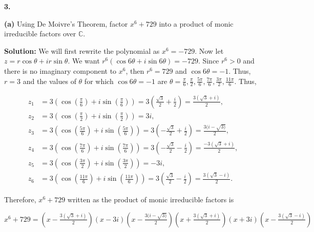 \documentclass[12pt, a4paper]{article}
\begin{document}
\vspace{6mm}

\noindent\textbf{3.}\par

\vspace{2mm}

\textbf{(a)} Using De Moivre's Theorem, factor $x^6+729$ into a product of monic irreducible factors over $\mathbb{C}$.

\vspace{4mm}

\noindent\textbf{Solution: }We will first rewrite the polynomial as $x^6=-729$. Now let $z=r\cos{\theta}+ir\sin{\theta}$. We want $r^6(\cos{6\theta}+i\sin{6\theta})=-729$. Since $r^6>0$ and there is no imaginary component to $x^6$, then $r^6=729$ and $\cos{6\theta}=-1$. Thus, $r=3$ and the values of $\theta$ for which $\cos{6\theta}=-1$ are $\theta=\frac{\pi}{6},\frac{\pi}{2},\frac{5\pi}{6},\frac{7\pi}{6},\frac{3\pi}{2},\frac{11\pi}{6}$. Thus,\par

\begin{align*} 
z_1 &=  3(\cos{(\frac{\pi}{6})}+i\sin{(\frac{\pi}{6})}) = 3(\frac{\sqrt{3}}{2}+\frac{i}{2})=\frac{3(\sqrt{3}+i)}{2}, \\ 
z_2 &=  3(\cos{(\frac{\pi}{2})}+i\sin{(\frac{\pi}{2})})=3i, \\
z_3 &=  3(\cos{(\frac{5\pi}{6})}+i\sin{(\frac{5\pi}{6})})=3(-\frac{\sqrt{3}}{2}+\frac{i}{2})=\frac{3(i-\sqrt{3)}}{2}, \\
z_4 &=  3(\cos{(\frac{7\pi}{6})}+i\sin{(\frac{7\pi}{6})})=3(-\frac{\sqrt{3}}{2}-\frac{i}{2})=\frac{-3(\sqrt{3}+i)}{2}, \\
z_5 &= 3(\cos{(\frac{3\pi}{2})}+i\sin{(\frac{3\pi}{2})})=-3i, \\
z_6 &= 3(\cos{(\frac{11\pi}{6})}+i\sin{(\frac{11\pi}{6})})=3(\frac{\sqrt{3}}{2}-\frac{i}{2})=\frac{3(\sqrt{3}-i)}{2}.
\end{align*}

\vspace{6mm}

\noindent Therefore, $x^6+729$ written as the product of monic irreducible factors is\par

\vspace{4mm}

\centerline{$x^6+729=(x-\frac{3(\sqrt{3}+i)}{2})(x-3i)(x-\frac{3(i-\sqrt{3)}}{2})(x+\frac{3(\sqrt{3}+i)}{2})(x+3i)(x-\frac{3(\sqrt{3}-i)}{2})$}

\vspace{4mm}
\end{document}
